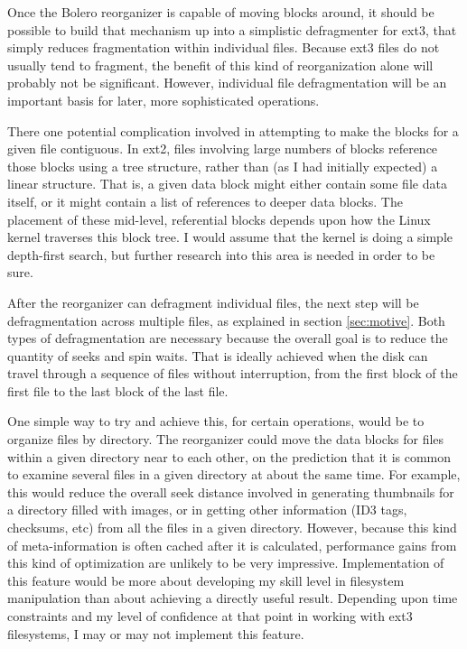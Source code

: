 \documentclass[10pt,twocolumn]{article}
\begin{document}
Once the Bolero reorganizer is capable of moving blocks around, it should be
possible to build that mechanism up into a simplistic defragmenter for ext3, that
simply reduces fragmentation within individual files. Because ext3 files do
not usually tend to fragment, the benefit of this kind of reorganization alone will
probably not be significant. However, individual file defragmentation will be an important
basis for later, more sophisticated operations.

There one potential complication involved in attempting to make the blocks for
a given file contiguous. In ext2, files involving large numbers of blocks
reference those blocks using a tree structure\cite{ext2intro}, rather than (as I had
initially expected) a linear structure. That is, a given data block might either
contain some file data itself, or it might contain a list of references to deeper
data blocks. The placement of these mid-level, referential blocks depends upon how the
Linux kernel traverses this block tree. I would assume that the kernel is
doing a simple depth-first search, but further research into this area is needed
in order to be sure.

After the reorganizer can defragment individual files, the next step will be
defragmentation across multiple files, as explained in section \ref{sec:motive}.
Both types of defragmentation are necessary because the overall goal is to reduce the quantity
of seeks and spin waits. That is ideally achieved when the disk can travel through
a sequence of files without interruption, from the first block of the first file to the last
block of the last file\cite{autolocality}.

One simple way to try and achieve this, for certain operations, would be to organize files by directory.
The reorganizer could move the data blocks for files within a given directory near to each other,
on the prediction that it is common to examine several files in a given
directory at about the same time. For example, this would reduce the overall seek distance
involved in generating thumbnails for a directory filled with images, or in
getting other information (ID3 tags, checksums, etc) from all the files in a
given directory. However, because this kind of meta-information is often
cached after it is calculated, performance gains from this kind of
optimization are unlikely to be very impressive. Implementation of this
feature would be more about developing my skill level in filesystem manipulation
than about achieving a directly useful result.
Depending upon time constraints and my level of confidence at that point in
working with ext3 filesystems, I may or may not implement this feature.
\end{document}
